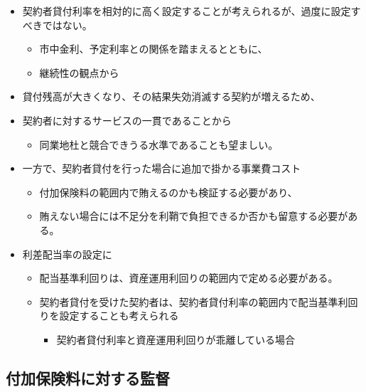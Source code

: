 \documentclass[]{article}
\begin{document}
\begin{itemize}
\tightlist
\item
  契約者貸付利率を相対的に高く設定することが考えられるが、過度に設定すべきではない。

  \begin{itemize}
  \tightlist
  \item
    市中金利、予定利率との関係を踏まえるとともに、
  \item
    継続性の観点から
  \end{itemize}
\item
  貸付残高が大きくなり、その結果失効消滅する契約が増えるため、
\item
  契約者に対するサービスの一貫であることから

  \begin{itemize}
  \tightlist
  \item
    同業地杜と競合できうる水準であることも望ましい。
  \end{itemize}
\item
  一方で、契約者貸付を行った場合に追加で掛かる事業費コスト

  \begin{itemize}
  \tightlist
  \item
    付加保険料の範囲内で賄えるのかも検証する必要があり、
  \item
    賄えない場合には不足分を利鞘で負担できるか否かも留意する必要がある。
  \end{itemize}
\item
  利差配当率の設定に

  \begin{itemize}
  \tightlist
  \item
    配当基準利回りは、資産運用利回りの範囲内で定める必要がある。
  \item
    契約者貸付を受けた契約者は、契約者貸付利率の範囲内で配当基準利回りを設定することも考えられる

    \begin{itemize}
    \tightlist
    \item
      契約者貸付利率と資産運用利回りが乖離している場合
    \end{itemize}
  \end{itemize}
\end{itemize}

\hypertarget{ux4ed8ux52a0ux4fddux967aux6599ux306bux5bfeux3059ux308bux76e3ux7763}{%
\subsection{付加保険料に対する監督}\label{ux4ed8ux52a0ux4fddux967aux6599ux306bux5bfeux3059ux308bux76e3ux7763}}
\end{document}

